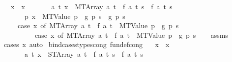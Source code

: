 \begin{isabellebody}
\ \ \ {\isachardoublequoteopen}x\ {\isacharequal}{\kern0pt}\ x{\isacharprime}{\kern0pt}{\isachardoublequoteclose}\isanewline
\ \ \ \ \ \ \ {\isachardoublequoteopen}{\isasymAnd}a\ t{\isachardot}{\kern0pt}\ x\ {\isacharequal}{\kern0pt}\ {\isacharparenleft}{\kern0pt}MTArray\ a\ t{\isacharparenright}{\kern0pt}\ {\isasymLongrightarrow}\ f\ a\ t\ s\ {\isacharequal}{\kern0pt}\ f{\isacharprime}{\kern0pt}\ a\ t\ s{\isachardoublequoteclose}\isanewline
\ \ \ \ \ \ \ {\isachardoublequoteopen}{\isasymAnd}p{\isachardot}{\kern0pt}\ x\ {\isacharequal}{\kern0pt}\ {\isacharparenleft}{\kern0pt}MTValue\ p{\isacharparenright}{\kern0pt}\ {\isasymLongrightarrow}\ g\ p\ s\ {\isacharequal}{\kern0pt}\ g{\isacharprime}{\kern0pt}\ p\ s{\isachardoublequoteclose}\isanewline
\ \ \ \ \ {\isachardoublequoteopen}{\isacharparenleft}{\kern0pt}case\ x\ of\ {\isacharparenleft}{\kern0pt}MTArray\ a\ t{\isacharparenright}{\kern0pt}\ {\isasymRightarrow}\ f\ a\ t\ {\isacharbar}{\kern0pt}\ {\isacharparenleft}{\kern0pt}MTValue\ p{\isacharparenright}{\kern0pt}\ {\isasymRightarrow}\ g\ p{\isacharparenright}{\kern0pt}\ s\isanewline
\ \ \ \ \ \ \ \ \ {\isacharequal}{\kern0pt}\ {\isacharparenleft}{\kern0pt}case\ x{\isacharprime}{\kern0pt}\ of\ {\isacharparenleft}{\kern0pt}MTArray\ a\ t{\isacharparenright}{\kern0pt}\ {\isasymRightarrow}\ f{\isacharprime}{\kern0pt}\ a\ t\ {\isacharbar}{\kern0pt}\ {\isacharparenleft}{\kern0pt}MTValue\ p{\isacharparenright}{\kern0pt}\ {\isasymRightarrow}\ g{\isacharprime}{\kern0pt}\ p{\isacharparenright}{\kern0pt}\ s{\isachardoublequoteclose}\isanewline
%
\isadelimproof
\ \ %
\endisadelimproof
%
\isatagproof
{}\isamarkupfalse%
\ assms\ \isamarkupfalse%
\ {\isacharparenleft}{\kern0pt}cases\ x{\isacharcomma}{\kern0pt}\ auto{\isacharparenright}{\kern0pt}%
\endisatagproof
{\isafoldproof}%
%
\isadelimproof
\isanewline
%
\endisadelimproof
\isanewline
{}\isamarkupfalse%
\ bind{\isacharunderscore}{\kern0pt}case{\isacharunderscore}{\kern0pt}stypes{\isacharunderscore}{\kern0pt}cong\ {\isacharbrackleft}{\kern0pt}fundef{\isacharunderscore}{\kern0pt}cong{\isacharbrackright}{\kern0pt}{\isacharcolon}{\kern0pt}\isanewline
\ \ \ {\isachardoublequoteopen}x\ {\isacharequal}{\kern0pt}\ x{\isacharprime}{\kern0pt}{\isachardoublequoteclose}\isanewline
\ \ \ \ \ \ \ {\isachardoublequoteopen}{\isasymAnd}a\ t{\isachardot}{\kern0pt}\ x\ {\isacharequal}{\kern0pt}\ {\isacharparenleft}{\kern0pt}STArray\ a\ t{\isacharparenright}{\kern0pt}\ {\isasymLongrightarrow}\ f\ a\ t\ s\ {\isacharequal}{\kern0pt}\ f{\isacharprime}{\kern0pt}\ a\ t\ s{\isachardoublequoteclose}\isanewline

\end{isabellebody}
